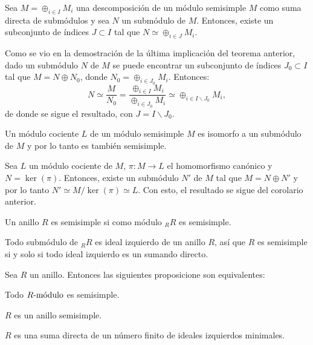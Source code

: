 \begin{corolario}
Sea $M = \oplus_{i \in I}M_i$ una descomposición de un módulo semisimple $M$ como suma directa de submódulos y sea $N$ un submódulo de $M$. Entonces, existe un subconjunto de índices $J \subset I $ tal que $N \simeq \oplus_{i \in J}M_i$.
\end{corolario}
\begin{proof*}
Como se vio en la demostración de la última implicación del teorema anterior, dado un submódulo $N$ de $M$ se puede encontrar un subconjunto de índices $J_0 \subset I$  tal que $M = N \oplus N_0$, donde $N_0 = \oplus_{i \in J_0}M_i$. Entonces:
\[ N \simeq \frac{M}{N_0} = \frac{\oplus_{i \in I}M_i}{\oplus_{i \in J_0}M_i} \simeq \oplus_{i \in I \backslash J_0} M_i, \] de donde se sigue el resultado, con $J = I \backslash J_0$.
\end{proof*}
\begin{corolario}
Un módulo cociente $L$ de un módulo semisimple $M$ es isomorfo a un submódulo de $M$ y por lo tanto es también semisimple.
\end{corolario}
\begin{proof*}
Sea $L$ un módulo cociente de $M$, $\pi \colon M \to L$ el homomorfismo canónico y $N = \ker(\pi)$. Entonces, existe un submódulo $N'$ de $M$ tal que $M = N \oplus N'$ y por lo tanto $N'\simeq M/\ker(\pi) \simeq L$. Con esto, el resultado se sigue del corolario anterior.
\end{proof*}
\begin{definicion}
Un anillo $R$ es semisimple si como módulo $_RR$ es semisimple. 
\end{definicion}
Todo submódulo de $_RR$ es ideal izquierdo de un anillo $R$, así que $R$ es semisimple si y solo si todo ideal izquierdo es un sumando directo.
\begin{teorema}
Sea $R$ un anillo. Entonces las siguientes proposicione son equivalentes:
\begin{bulletList}
\item\label{item:rssimple1} Todo $\modulo{R}$ es semisimple.
\item\label{item:rssimple2} $R$ es un anillo semisimple.
\item\label{item:rssimple3} $R$ es una suma directa de un número finito de ideales izquierdos minimales.
\end{bulletList}
\end{teorema}
